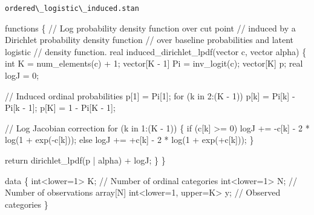 \documentclass[
  letterpaper,
  DIV=11,
  numbers=noendperiod]{scrartcl}
\newenvironment{Shaded}{\begin{snugshade}}{\end{snugshade}}
\newcommand{\CommentTok}[1]{\textcolor[rgb]{0.37,0.37,0.37}{#1}}
\newcommand{\ControlFlowTok}[1]{\textcolor[rgb]{0.00,0.23,0.31}{#1}}
\newcommand{\DataTypeTok}[1]{\textcolor[rgb]{0.68,0.00,0.00}{#1}}
\newcommand{\DecValTok}[1]{\textcolor[rgb]{0.68,0.00,0.00}{#1}}
\newcommand{\KeywordTok}[1]{\textcolor[rgb]{0.00,0.23,0.31}{#1}}
\newcommand{\NormalTok}[1]{\textcolor[rgb]{0.00,0.23,0.31}{#1}}
\begin{document}
\begin{codelisting}

\caption{\texttt{ordered\textbackslash\_logistic\textbackslash\_induced.stan}}

\begin{Shaded}
\begin{Highlighting}[]
\KeywordTok{functions}\NormalTok{ \{}
  \CommentTok{// Log probability density function over cut point}
  \CommentTok{// induced by a Dirichlet probability density function}
  \CommentTok{// over baseline probabilities and latent logistic}
  \CommentTok{// density function.}
  \DataTypeTok{real}\NormalTok{ induced\_dirichlet\_lpdf(}\DataTypeTok{vector}\NormalTok{ c, }\DataTypeTok{vector}\NormalTok{ alpha) \{}
    \DataTypeTok{int}\NormalTok{ K = num\_elements(c) + }\DecValTok{1}\NormalTok{;}
    \DataTypeTok{vector}\NormalTok{[K {-} }\DecValTok{1}\NormalTok{] Pi = inv\_logit(c);}
    \DataTypeTok{vector}\NormalTok{[K] p;}
    \DataTypeTok{real}\NormalTok{ logJ = }\DecValTok{0}\NormalTok{;}

    \CommentTok{// Induced ordinal probabilities}
\NormalTok{    p[}\DecValTok{1}\NormalTok{] = Pi[}\DecValTok{1}\NormalTok{];}
    \ControlFlowTok{for}\NormalTok{ (k }\ControlFlowTok{in} \DecValTok{2}\NormalTok{:(K {-} }\DecValTok{1}\NormalTok{))}
\NormalTok{      p[k] = Pi[k] {-} Pi[k {-} }\DecValTok{1}\NormalTok{];}
\NormalTok{    p[K] = }\DecValTok{1}\NormalTok{ {-} Pi[K {-} }\DecValTok{1}\NormalTok{];}

    \CommentTok{// Log Jacobian correction}
    \ControlFlowTok{for}\NormalTok{ (k }\ControlFlowTok{in} \DecValTok{1}\NormalTok{:(K {-} }\DecValTok{1}\NormalTok{)) \{}
      \ControlFlowTok{if}\NormalTok{ (c[k] \textgreater{}= }\DecValTok{0}\NormalTok{)}
\NormalTok{        logJ += {-}c[k] {-} }\DecValTok{2}\NormalTok{ * log(}\DecValTok{1}\NormalTok{ + exp({-}c[k]));}
      \ControlFlowTok{else}
\NormalTok{        logJ += +c[k] {-} }\DecValTok{2}\NormalTok{ * log(}\DecValTok{1}\NormalTok{ + exp(+c[k]));}
\NormalTok{    \}}

    \ControlFlowTok{return}\NormalTok{ dirichlet\_lpdf(p | alpha) + logJ;}
\NormalTok{  \}}
\NormalTok{\}}

\KeywordTok{data}\NormalTok{ \{}
  \DataTypeTok{int}\NormalTok{\textless{}}\KeywordTok{lower}\NormalTok{=}\DecValTok{1}\NormalTok{\textgreater{} K;                   }\CommentTok{// Number of ordinal categories}
  \DataTypeTok{int}\NormalTok{\textless{}}\KeywordTok{lower}\NormalTok{=}\DecValTok{1}\NormalTok{\textgreater{} N;                   }\CommentTok{// Number of observations}
  \DataTypeTok{array}\NormalTok{[N] }\DataTypeTok{int}\NormalTok{\textless{}}\KeywordTok{lower}\NormalTok{=}\DecValTok{1}\NormalTok{, }\KeywordTok{upper}\NormalTok{=K\textgreater{} y; }\CommentTok{// Observed categories}
\NormalTok{\}}


\end{Highlighting}
\end{Shaded}
\end{codelisting}
\end{document}
